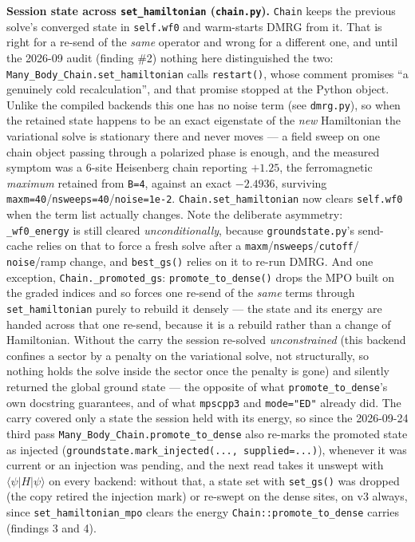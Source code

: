 \documentclass[11pt]{article}
\begin{document}
\textbf{Session state across \texttt{set\_hamiltonian}
(\texttt{chain.py}).} \texttt{Chain} keeps the previous solve's converged
state in \texttt{self.wf0} and warm-starts DMRG from it. That is right
for a re-send of the \emph{same} operator and wrong for a different one,
and until the 2026-09 audit (finding \#2) nothing here distinguished the
two: \texttt{Many\_Body\_Chain.set\_hamiltonian} calls
\texttt{restart()}, whose comment promises ``a genuinely cold
recalculation'', and that promise stopped at the Python object. Unlike
the compiled backends this one has no noise term (see
\texttt{dmrg.py}), so when the retained state happens to be an exact
eigenstate of the \emph{new} Hamiltonian the variational solve is
stationary there and never moves --- a field sweep on one chain object
passing through a polarized phase is enough, and the measured symptom was
a 6-site Heisenberg chain reporting $+1.25$, the ferromagnetic
\emph{maximum} retained from \texttt{B=4}, against an exact $-2.4936$,
surviving \texttt{maxm=40}/\texttt{nsweeps=40}/\texttt{noise=1e-2}.
\texttt{Chain.set\_hamiltonian} now clears \texttt{self.wf0} when the
term list actually changes. Note the deliberate asymmetry:
\texttt{\_wf0\_energy} is still cleared \emph{unconditionally}, because
\texttt{groundstate.py}'s send-cache relies on that to force a fresh
solve after a \texttt{maxm}/\texttt{nsweeps}/\texttt{cutoff}/
\texttt{noise}/ramp change, and \texttt{best\_gs()} relies on it to
re-run DMRG. And one exception, \texttt{Chain.\_promoted\_gs}:
\texttt{promote\_to\_dense()} drops the MPO built on the graded indices
and so forces one re-send of the \emph{same} terms through
\texttt{set\_hamiltonian} purely to rebuild it densely --- the state and
its energy are handed across that one re-send, because it is a rebuild
rather than a change of Hamiltonian. Without the carry the session
re-solved \emph{unconstrained} (this backend confines a sector by a
penalty on the variational solve, not structurally, so nothing holds the
solve inside the sector once the penalty is gone) and silently returned
the global ground state --- the opposite of what
\texttt{promote\_to\_dense}'s own docstring guarantees, and of what
\texttt{mpscpp3} and \texttt{mode="ED"} already did. The carry covered
only a state the session held with its energy, so since the 2026-09-24
third pass \texttt{Many\_Body\_Chain.promote\_to\_dense} also re-marks the
promoted state as injected (\texttt{groundstate.mark\_injected(...,
supplied=...)}), whenever it was current or an injection was pending, and
the next read takes it unswept with $\langle\psi|H|\psi\rangle$ on every
backend: without that, a state set with \texttt{set\_gs()} was dropped
(the copy retired the injection mark) or re-swept on the dense sites, on
v3 always, since \texttt{set\_hamiltonian\_mpo} clears the energy
\texttt{Chain::promote\_to\_dense} carries (findings 3 and 4).
\end{document}
